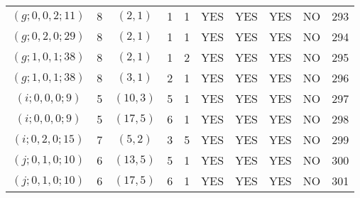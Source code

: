 \begin{longtable}{|c|c|c|c|c|c|c|c|c|c|}
$(g; 0, 0, 2; 11)$ & 8 & $(2, 1)$ & 1 & 1 & YES & YES & YES & NO & 293\\
$(g; 0, 2, 0; 29)$ & 8 & $(2, 1)$ & 1 & 1 & YES & YES & YES & NO & 294\\
$(g; 1, 0, 1; 38)$ & 8 & $(2, 1)$ & 1 & 2 & YES & YES & YES & NO & 295\\
$(g; 1, 0, 1; 38)$ & 8 & $(3, 1)$ & 2 & 1 & YES & YES & YES & NO & 296\\
$(i; 0, 0, 0; 9)$ & 5 & $(10, 3)$ & 5 & 1 & YES & YES & YES & NO & 297\\
$(i; 0, 0, 0; 9)$ & 5 & $(17, 5)$ & 6 & 1 & YES & YES & YES & NO & 298\\
$(i; 0, 2, 0; 15)$ & 7 & $(5, 2)$ & 3 & 5 & YES & YES & YES & NO & 299\\
$(j; 0, 1, 0; 10)$ & 6 & $(13, 5)$ & 5 & 1 & YES & YES & YES & NO & 300\\
$(j; 0, 1, 0; 10)$ & 6 & $(17, 5)$ & 6 & 1 & YES & YES & YES & NO & 301
\end{longtable}
